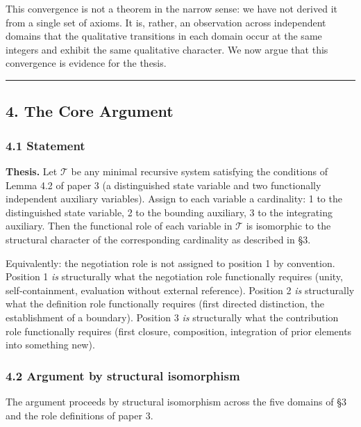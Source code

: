 \documentclass[
  11pt,
  letterpaper,
]{article}
\begin{document}
This convergence is not a theorem in the narrow sense: we have not
derived it from a single set of axioms. It is, rather, an observation
across independent domains that the qualitative transitions in each
domain occur at the same integers and exhibit the same qualitative
character. We now argue that this convergence is evidence for the
thesis.

\begin{center}\rule{0.5\linewidth}{0.5pt}\end{center}

\subsection{4. The Core Argument}\label{the-core-argument}

\subsubsection{4.1 Statement}\label{statement}

\textbf{Thesis.} Let \(\mathcal{T}\) be any minimal recursive system
satisfying the conditions of Lemma 4.2 of paper 3 (a distinguished state
variable and two functionally independent auxiliary variables). Assign
to each variable a cardinality: 1 to the distinguished state variable, 2
to the bounding auxiliary, 3 to the integrating auxiliary. Then the
functional role of each variable in \(\mathcal{T}\) is isomorphic to the
structural character of the corresponding cardinality as described in
§3.

Equivalently: the negotiation role is not assigned to position 1 by
convention. Position 1 \emph{is} structurally what the negotiation role
functionally requires (unity, self-containment, evaluation without
external reference). Position 2 \emph{is} structurally what the
definition role functionally requires (first directed distinction, the
establishment of a boundary). Position 3 \emph{is} structurally what the
contribution role functionally requires (first closure, composition,
integration of prior elements into something new).

\subsubsection{4.2 Argument by structural
isomorphism}\label{argument-by-structural-isomorphism}

The argument proceeds by structural isomorphism across the five domains
of §3 and the role definitions of paper 3.
\end{document}
